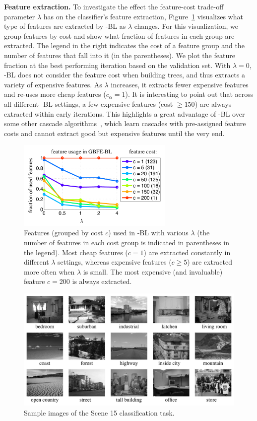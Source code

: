 \textbf{Feature extraction.}
To investigate the effect the feature-cost trade-off parameter $\lambda$ has on the classifier's feature extraction, Figure~\ref{fig:features} visualizes what type of features are extracted by \name{}-BL as $\lambda$ changes. For this visualization, we group features by cost and show what fraction of features in each group are extracted. The legend in the right indicates the cost of a feature group and the number of features that fall into it (in the parentheses). We plot the feature fraction at the best performing iteration based on the 
validation set. With $\lambda\!=\! 0$,  \name{}-BL does not consider the 
feature cost when building trees, and thus extracts a variety of expensive features. As $\lambda$ increases, it extracts fewer expensive features and re-uses more cheap 
features ($c_\alpha\!=\! 1$). It is interesting to point out that across all different \name{}-BL settings, a few expensive features (cost $\!\ge\!150$) are always extracted within early iterations. This highlights a great advantage of \name{}-BL over some other cascade algorithms~\citep{raykar2010designing}, which learn cascades with pre-assigned feature costs and cannot extract good but expensive features until the very end. 

\begin{figure}[t]
\centerline{
\includegraphics[width = 0.67\textwidth]{plots/features_onegraph}
}
\caption{Features (grouped by cost $c$) used in \name{}-BL with various $\lambda$ (the number of features in each cost group is indicated in parentheses in the legend). 
Most cheap features ($c\!=\!1$) are extracted constantly in different $\lambda$ settings, whereas expensive features ($c\!\geq\! 5$) are extracted more often when $\lambda$ is small. 
The most expensive (and invaluable) feature $c=200$ is always extracted.  
\label{fig:features} }
\end{figure}

\begin{figure}[t]
\centerline{
\includegraphics[width = .67\textwidth]{plots/scene15_samples_small}
}
\caption{Sample images of the Scene 15 classification task.\label{fig:sample_images}}
\end{figure}

